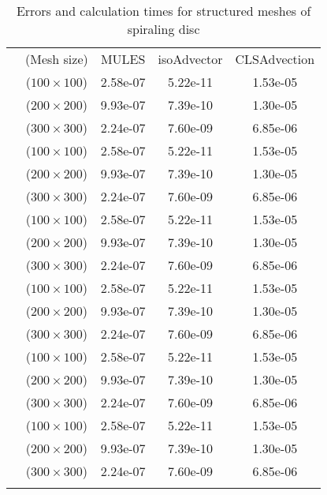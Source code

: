\begin{table}
\centering
\caption{Errors and calculation times for structured meshes of spiraling disc}
\label{Tab:04}
\begin{tabular}{ccccc}
\hline\noalign{\smallskip}
\quad &(Mesh size) & MULES &isoAdvector &CLSAdvection  \\
\noalign{\smallskip}\hline\noalign{\smallskip}
\multirow{5}{*}{$\varepsilon_{V}$}
&($100\times{100}$)& 2.58e-07 &5.22e-11 &1.53e-05  \\
&($200\times{200}$) & 9.93e-07 &7.39e-10 &1.30e-05\\
&($300\times{300}$)& 2.24e-07 &7.60e-09 &6.85e-06\\
\hline\noalign{\smallskip}
\multirow{5}{*}{$\varepsilon_{M}$}
&($100\times{100}$)& 2.58e-07 &5.22e-11 &1.53e-05  \\
&($200\times{200}$) & 9.93e-07 &7.39e-10 &1.30e-05\\
&($300\times{300}$)& 2.24e-07 &7.60e-09 &6.85e-06\\
\hline\noalign{\smallskip}
\multirow{5}{*}{$\varepsilon_{S}$}
&($100\times{100}$)& 2.58e-07 &5.22e-11 &1.53e-05  \\
&($200\times{200}$) & 9.93e-07 &7.39e-10 &1.30e-05\\
&($300\times{300}$)& 2.24e-07 &7.60e-09 &6.85e-06\\
\hline\noalign{\smallskip}
\multirow{5}{*}{$\min(\alpha)$}
&($100\times{100}$)& 2.58e-07 &5.22e-11 &1.53e-05  \\
&($200\times{200}$) & 9.93e-07 &7.39e-10 &1.30e-05\\
&($300\times{300}$)& 2.24e-07 &7.60e-09 &6.85e-06\\
\hline\noalign{\smallskip}
\multirow{5}{*}{$\max(\alpha)-1$}
&($100\times{100}$)& 2.58e-07 &5.22e-11 &1.53e-05  \\
&($200\times{200}$) & 9.93e-07 &7.39e-10 &1.30e-05\\
&($300\times{300}$)& 2.24e-07 &7.60e-09 &6.85e-06\\
\hline\noalign{\smallskip}
\multirow{5}{*}{$T_{calc}$}
&($100\times{100}$)& 2.58e-07 &5.22e-11 &1.53e-05  \\
&($200\times{200}$) & 9.93e-07 &7.39e-10 &1.30e-05\\
&($300\times{300}$)& 2.24e-07 &7.60e-09 &6.85e-06\\
\noalign{\smallskip}\hline
\end{tabular}
\end{table}
